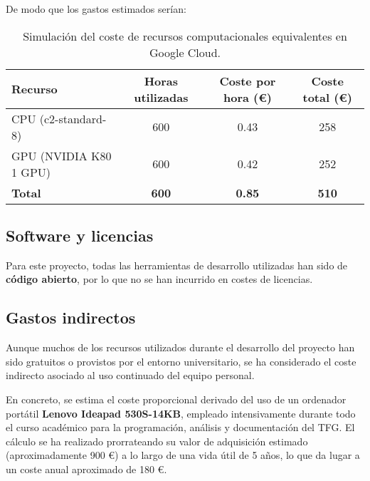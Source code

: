 De modo que los gastos estimados serían:
\begin{table}[htp]
    \centering
    \begin{adjustbox}{width=\linewidth}
        \begin{tabular}{|l|c|c|c|}
            \hline
            \textbf{Recurso}       & \textbf{Horas utilizadas} & \textbf{Coste por hora (€)} &
            \textbf{Coste total (€)}                                                                        \\ \hline
            CPU (c2-standard-8)    & 600                       & 0.43                        & 258          \\
            GPU (NVIDIA K80 1 GPU) & 600                       & 0.42                        & 252          \\ \hline
            \textbf{Total}         & \textbf{600}              & \textbf{0.85}               & \textbf{510} \\ \hline
        \end{tabular}
    \end{adjustbox}
    \caption{Simulación del coste de recursos computacionales equivalentes en Google Cloud.}
    \label{tab:recursos-computacionales}
\end{table}


\subsection{Software y licencias}\label{subsec:software-y-licencias}
Para este proyecto, todas las herramientas de desarrollo utilizadas han sido de \textbf{código abierto},
por lo que no se han incurrido en costes de licencias.

\subsection{Gastos indirectos}\label{subsec:gastos-indirectos}
Aunque muchos de los recursos utilizados durante el desarrollo del proyecto han sido gratuitos o provistos por el entorno universitario, 
se ha considerado el coste indirecto asociado al uso continuado del equipo personal.

En concreto, se estima el coste proporcional derivado del uso de un ordenador portátil \textbf{Lenovo Ideapad 530S-14KB}, 
empleado intensivamente durante todo el curso académico para la programación, análisis y documentación del TFG. 
El cálculo se ha realizado prorrateando su valor de adquisición estimado (aproximadamente 900 €) a lo largo de una vida útil de 5 años, 
lo que da lugar a un coste anual aproximado de 180 €.

